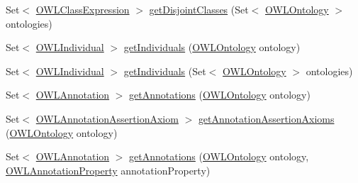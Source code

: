 \begin{DoxyCompactItemize}
Set$<$ \hyperlink{interfaceorg_1_1semanticweb_1_1owlapi_1_1model_1_1_o_w_l_class_expression}{O\-W\-L\-Class\-Expression} $>$ \hyperlink{classuk_1_1ac_1_1manchester_1_1cs_1_1owl_1_1owlapi_1_1_o_w_l_class_impl_ac4e89c4ac78de002afae649ae7b6b50c}{get\-Disjoint\-Classes} (Set$<$ \hyperlink{interfaceorg_1_1semanticweb_1_1owlapi_1_1model_1_1_o_w_l_ontology}{O\-W\-L\-Ontology} $>$ ontologies)
\item 
Set$<$ \hyperlink{interfaceorg_1_1semanticweb_1_1owlapi_1_1model_1_1_o_w_l_individual}{O\-W\-L\-Individual} $>$ \hyperlink{classuk_1_1ac_1_1manchester_1_1cs_1_1owl_1_1owlapi_1_1_o_w_l_class_impl_a70aaafd15415872b3b00986d51d77375}{get\-Individuals} (\hyperlink{interfaceorg_1_1semanticweb_1_1owlapi_1_1model_1_1_o_w_l_ontology}{O\-W\-L\-Ontology} ontology)
\item 
Set$<$ \hyperlink{interfaceorg_1_1semanticweb_1_1owlapi_1_1model_1_1_o_w_l_individual}{O\-W\-L\-Individual} $>$ \hyperlink{classuk_1_1ac_1_1manchester_1_1cs_1_1owl_1_1owlapi_1_1_o_w_l_class_impl_af00d58aa8d1fe59288354d9cce11ec38}{get\-Individuals} (Set$<$ \hyperlink{interfaceorg_1_1semanticweb_1_1owlapi_1_1model_1_1_o_w_l_ontology}{O\-W\-L\-Ontology} $>$ ontologies)
\item 
Set$<$ \hyperlink{interfaceorg_1_1semanticweb_1_1owlapi_1_1model_1_1_o_w_l_annotation}{O\-W\-L\-Annotation} $>$ \hyperlink{classuk_1_1ac_1_1manchester_1_1cs_1_1owl_1_1owlapi_1_1_o_w_l_class_impl_a21ed4e8fc7406bc5f3a699a5fa9638fc}{get\-Annotations} (\hyperlink{interfaceorg_1_1semanticweb_1_1owlapi_1_1model_1_1_o_w_l_ontology}{O\-W\-L\-Ontology} ontology)
\item 
Set$<$ \hyperlink{interfaceorg_1_1semanticweb_1_1owlapi_1_1model_1_1_o_w_l_annotation_assertion_axiom}{O\-W\-L\-Annotation\-Assertion\-Axiom} $>$ \hyperlink{classuk_1_1ac_1_1manchester_1_1cs_1_1owl_1_1owlapi_1_1_o_w_l_class_impl_a468dfc132ef2638dcdadbbbb5e9763db}{get\-Annotation\-Assertion\-Axioms} (\hyperlink{interfaceorg_1_1semanticweb_1_1owlapi_1_1model_1_1_o_w_l_ontology}{O\-W\-L\-Ontology} ontology)
\item 
Set$<$ \hyperlink{interfaceorg_1_1semanticweb_1_1owlapi_1_1model_1_1_o_w_l_annotation}{O\-W\-L\-Annotation} $>$ \hyperlink{classuk_1_1ac_1_1manchester_1_1cs_1_1owl_1_1owlapi_1_1_o_w_l_class_impl_ae8ba14be4b70dae38537cac53f6815ee}{get\-Annotations} (\hyperlink{interfaceorg_1_1semanticweb_1_1owlapi_1_1model_1_1_o_w_l_ontology}{O\-W\-L\-Ontology} ontology, \hyperlink{interfaceorg_1_1semanticweb_1_1owlapi_1_1model_1_1_o_w_l_annotation_property}{O\-W\-L\-Annotation\-Property} annotation\-Property)

\end{DoxyCompactItemize}
